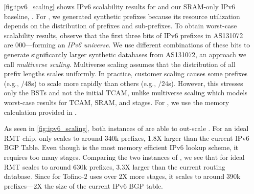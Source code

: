 \cref{fig:ipv6_scaling} shows IPv6 scalability results for \bsic and our SRAM-only IPv6 baseline, \hibst. For \bsic, we generated synthetic prefixes because its resource utilization depends on the distribution of prefixes and sub-prefixes. To obtain worst-case scalability results, observe that the first three bits of IPv6 prefixes in AS131072 are 000---forming an {\em IPv6 universe}. We use different combinations of these bits to generate significantly larger synthetic databases from AS131072, an approach we call {\em multiverse scaling}. Multiverse scaling assumes that the distribution of all prefix lengths scales uniformly. In practice, customer scaling causes some prefixes (e.g., /48s) to scale more rapidly than others (e.g., /24s). However, this stresses only the BSTs and not the initial TCAM, unlike multiverse scaling which models worst-case results for TCAM, SRAM, and stages. For \hibst, we use the memory calculation provided in \cite{hibst}.

As seen in \cref{fig:ipv6_scaling}, both instances of \bsic are able to out-scale \hibst. For an ideal RMT chip, \hibst only scales to around 340k prefixes, 1.8X larger than the current IPv6 BGP Table. Even though \hibst is the most memory efficient IPv6 lookup scheme, it requires too many stages. Comparing the two instances of \bsic, we see that \bsic for ideal RMT scales to around 630k prefixes, 3.3X larger than the current routing database. Since \bsic for Tofino-2 uses over 2X more stages, it scales to around 390k prefixes---2X the size of the current IPv6 BGP table.
